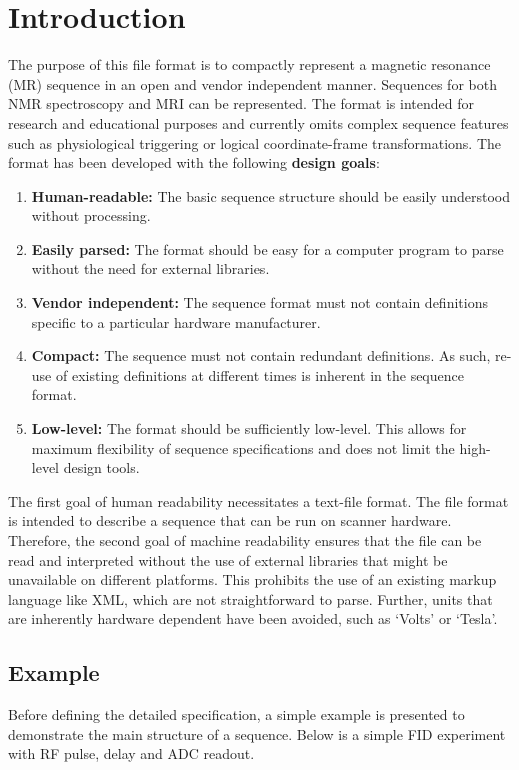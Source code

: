 \documentclass{article}
\begin{document}
\section{Introduction}
The purpose of this file format is to compactly represent a magnetic resonance (MR) sequence in an open and vendor independent manner. Sequences for both NMR spectroscopy and MRI can be represented. The format is intended for research and educational purposes and currently omits complex sequence features such as physiological triggering or logical coordinate-frame transformations. The format has been developed with the following \textbf{design goals}:
\begin{enumerate}
\item \textbf{Human-readable:} The basic sequence structure should be easily understood without processing.
\item \textbf{Easily parsed:} The format should be easy for a computer program to parse without the need for external libraries.
\item \textbf{Vendor independent:} The sequence format must not contain definitions specific to a particular hardware manufacturer.
\item \textbf{Compact:} The sequence must not contain redundant definitions. As such, re-use of existing definitions at different times is inherent in the sequence format.
\item \textbf{Low-level:} The format should be sufficiently low-level. This allows for maximum flexibility of sequence specifications and does not limit the high-level design tools.
\end{enumerate}

The first goal of human readability necessitates a text-file format. The file format is intended to describe a sequence that can be run on scanner hardware. Therefore, the second goal of machine readability ensures that the file can be read and interpreted without the use of external libraries that might be unavailable on different platforms. This prohibits the use of an existing markup language like XML, which are not straightforward to parse. Further, units  that are inherently hardware dependent have been avoided, such as `Volts' or `Tesla'.


\subsection{Example}

Before defining the detailed specification, a simple example is presented to demonstrate the main structure of a sequence. Below is a simple FID experiment with RF pulse, delay and ADC readout.

\end{document}

